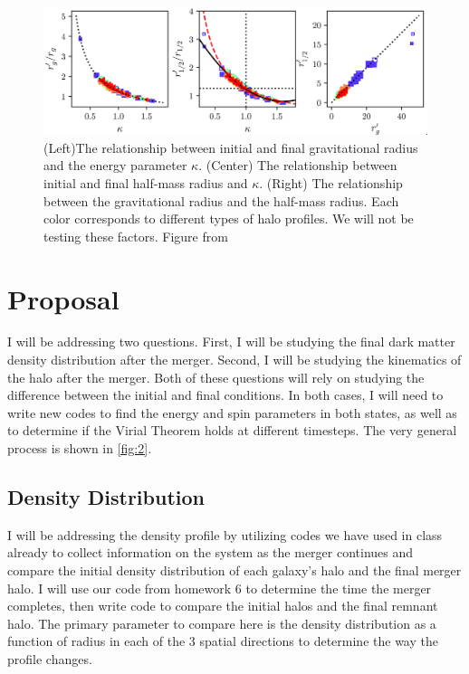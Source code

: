 \documentclass[linenumbers]{aastex631}
\begin{document}
\begin{figure}[h!]
    \centering
    \includegraphics[width=\textwidth]{Drakos2019bFig7.jpg}
    \caption{(Left)The relationship between initial and final gravitational radius and the energy parameter $\kappa$. (Center) The relationship between initial and final half-mass radius and $\kappa$. (Right) The relationship between the gravitational radius and the half-mass radius. Each color corresponds to different types of halo profiles. We will not be testing these factors. Figure from \cite{DrakosB}}
    \label{fig:1}
\end{figure}
\newpage
\section{Proposal}

I will be addressing two questions. First, I will be studying the final dark matter density distribution after the merger. Second, I will be studying the kinematics of the halo after the merger. Both of these questions will rely on studying the difference between the initial and final conditions. In both cases, I will need to write new codes to find the energy and spin parameters in both states, as well as to determine if the Virial Theorem holds at different timesteps. The very general process is shown in \ref{fig:2}.
\subsection{Density Distribution}
I will be addressing the density profile by utilizing codes we have used in class already to collect information on the system as the merger continues and compare the initial density distribution of each galaxy's halo and the final merger halo. I will use our code from homework 6 to determine the time the merger completes, then write code to compare the initial halos and the final remnant halo. The primary parameter to compare here is the density distribution as a function of radius in each of the 3 spatial directions to determine the way the profile changes.
\end{document}
